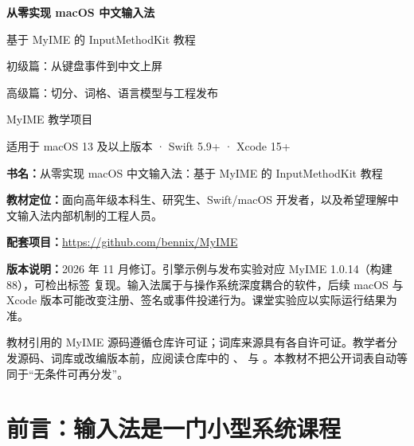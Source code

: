 \begin{titlepage}
  \centering
  \vspace*{2.5cm}
  {\fontsize{30}{38}\selectfont\bfseries\color{MyDark} 从零实现 macOS 中文输入法\par}
  \vspace{0.8cm}
  {\Large 基于 MyIME 的 InputMethodKit 教程\par}
  \vspace{1.6cm}
  {\large 初级篇：从键盘事件到中文上屏\par}
  \vspace{0.35cm}
  {\large 高级篇：切分、词格、语言模型与工程发布\par}
  \vfill
  \vfill
  {\large MyIME 教学项目\par}
  \vspace{0.3cm}
  {\small 适用于 macOS 13 及以上版本 · Swift 5.9+ · Xcode 15+\par}
  \vspace{1cm}
\end{titlepage}

\thispagestyle{empty}
\noindent\textbf{书名：}从零实现 macOS 中文输入法：基于 MyIME 的 InputMethodKit 教程

\noindent\textbf{教材定位：}面向高年级本科生、研究生、Swift/macOS 开发者，以及希望理解中文输入法内部机制的工程人员。

\noindent\textbf{配套项目：}\url{https://github.com/bennix/MyIME}

\noindent\textbf{版本说明：}2026 年 11 月修订。引擎示例与发布实验对应 MyIME 1.0.14（构建 88），可检出标签  复现。输入法属于与操作系统深度耦合的软件，后续 macOS 与 Xcode 版本可能改变注册、签名或事件投递行为。课堂实验应以实际运行结果为准。

\vfill
\begin{warningbox}[许可与引用]
教材引用的 MyIME 源码遵循仓库许可证；词库来源具有各自许可证。教学者分发源码、词库或改编版本前，应阅读仓库中的 、 与 。本教材不把公开词表自动等同于“无条件可再分发”。
\end{warningbox}
\clearpage

\chapter*{前言：输入法是一门小型系统课程}

